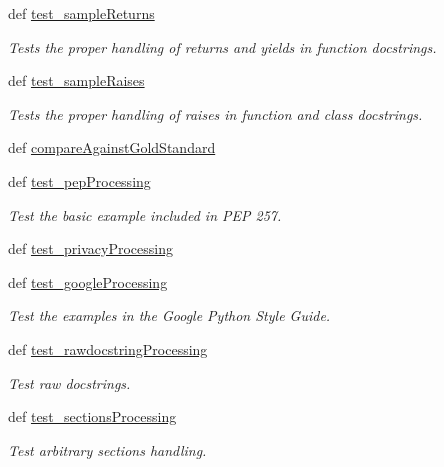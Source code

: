 \begin{DoxyCompactItemize}
def \hyperlink{classdoxypypy_1_1test_1_1test__doxypypy_1_1_test_doxypypy_a32d937ff445fd37d42e628334bf006b0}{test\-\_\-sample\-Returns}
\begin{DoxyCompactList}\small\item\em Tests the proper handling of returns and yields in function docstrings. \end{DoxyCompactList}\item 
def \hyperlink{classdoxypypy_1_1test_1_1test__doxypypy_1_1_test_doxypypy_ab53e3e5dad4869cc13a85c6aa206a22b}{test\-\_\-sample\-Raises}
\begin{DoxyCompactList}\small\item\em Tests the proper handling of raises in function and class docstrings. \end{DoxyCompactList}\item 
def \hyperlink{classdoxypypy_1_1test_1_1test__doxypypy_1_1_test_doxypypy_a1e030398f88190564e82e6676a352158}{compare\-Against\-Gold\-Standard}
\item 
def \hyperlink{classdoxypypy_1_1test_1_1test__doxypypy_1_1_test_doxypypy_a2c7d815209c8855b81bfe1c31fd4c358}{test\-\_\-pep\-Processing}
\begin{DoxyCompactList}\small\item\em Test the basic example included in P\-E\-P 257. \end{DoxyCompactList}\item 
def \hyperlink{classdoxypypy_1_1test_1_1test__doxypypy_1_1_test_doxypypy_a4d65bd35b177aeac82b00b1ccb11f599}{test\-\_\-privacy\-Processing}
\item 
def \hyperlink{classdoxypypy_1_1test_1_1test__doxypypy_1_1_test_doxypypy_a862312440abb62e8340c4cc012c313fa}{test\-\_\-google\-Processing}
\begin{DoxyCompactList}\small\item\em Test the examples in the Google Python Style Guide. \end{DoxyCompactList}\item 
def \hyperlink{classdoxypypy_1_1test_1_1test__doxypypy_1_1_test_doxypypy_ade334b612f103a5e14e9c9a8cb75d0a0}{test\-\_\-rawdocstring\-Processing}
\begin{DoxyCompactList}\small\item\em Test raw docstrings. \end{DoxyCompactList}\item 
def \hyperlink{classdoxypypy_1_1test_1_1test__doxypypy_1_1_test_doxypypy_a4407691f16cc5b97f70d6bccb3e77ac8}{test\-\_\-sections\-Processing}
\begin{DoxyCompactList}\small\item\em Test arbitrary sections handling. \end{DoxyCompactList}\item 

\end{DoxyCompactItemize}
